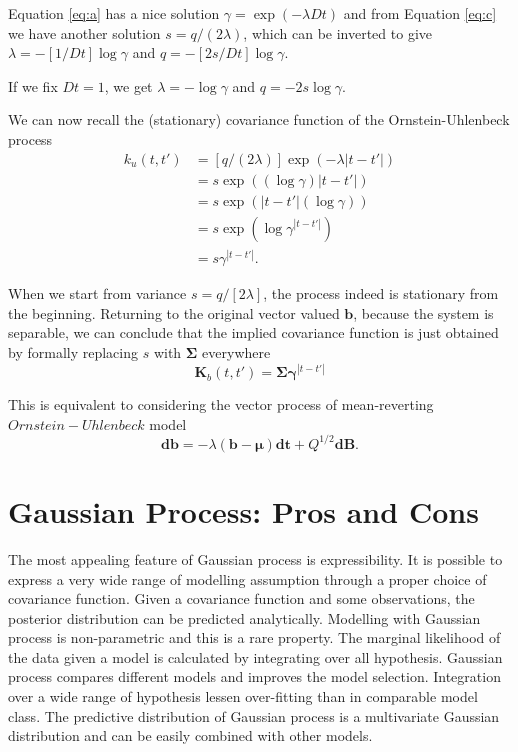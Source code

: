 Equation \ref{eq:a} has a nice solution $\gamma = \exp(-\lambda Dt)$ and from Equation \ref{eq:c} we have another solution
$s = q / (2 \lambda)$,
which can be inverted to give
$\lambda = -[1 / Dt] \log \gamma$ and
$q = -[2 s / Dt] \log \gamma$. 

If we fix $Dt = 1$, we get
$\lambda = -\log \gamma$ and $q = -2 s \log \gamma$.

We can now recall the (stationary) covariance function of the Ornstein-Uhlenbeck process 
\begin{equation*} \label{eq:ku}
\begin{split}
k_u(t,t') &= [q / (2 \lambda)] \exp(-\lambda {\left|t-t'\right|})\\
	   &= s \exp((\log \gamma) {\left|t-t'\right|})\\
	   &= s \exp({\left|t-t'\right|}(\log \gamma))\\
	   &= s \exp(\log \gamma^{\left|t-t'\right|})\\
	   &= s \gamma^{\left|t-t'\right|}.
\end{split}
\end{equation*}

When we start from variance $s = q / \left[2 \lambda\right]$, the process indeed is stationary from the beginning. Returning to the original vector valued $\textbf{b}$, because the system is separable, we can conclude that the implied covariance function is just obtained by formally replacing $s$ with $\boldsymbol{\Sigma}$ everywhere
\begin{equation}
\textbf{K}_b(t,t') = \boldsymbol{\Sigma} \boldsymbol{\gamma}^{\left|t-t'\right|}
\end{equation}

This is equivalent to considering the vector process of mean-reverting $Ornstein-Uhlenbeck$ model
\begin{equation}
\textbf{db} = -\lambda (\textbf{b} - \boldsymbol{\mu}) \textbf{dt} + Q^{1/2} \textbf{dB}.
\end{equation}

\section{Gaussian Process: Pros and Cons}
The most appealing feature of Gaussian process is expressibility. It is possible to express a very wide range of modelling assumption through a proper choice of covariance function. Given a covariance function and some observations, the posterior distribution can be predicted analytically. Modelling with Gaussian process is non-parametric and this is a rare property. The marginal likelihood of the data given a model is calculated by integrating over all hypothesis. Gaussian process compares different models and improves the model selection. Integration over a wide range of hypothesis lessen over-fitting than in comparable model class. The predictive distribution of Gaussian process is a multivariate Gaussian distribution and can be easily combined with other models.

